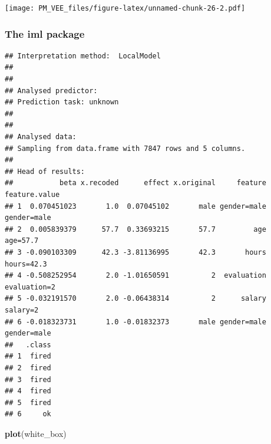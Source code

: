 \documentclass[]{krantz}
\newenvironment{Shaded}{\begin{snugshade}}{\end{snugshade}}
\newcommand{\DataTypeTok}[1]{\textcolor[rgb]{0.13,0.29,0.53}{#1}}
\newcommand{\DecValTok}[1]{\textcolor[rgb]{0.00,0.00,0.81}{#1}}
\newcommand{\KeywordTok}[1]{\textcolor[rgb]{0.13,0.29,0.53}{\textbf{#1}}}
\newcommand{\NormalTok}[1]{#1}
\newcommand{\OperatorTok}[1]{\textcolor[rgb]{0.81,0.36,0.00}{\textbf{#1}}}
\newcommand{\StringTok}[1]{\textcolor[rgb]{0.31,0.60,0.02}{#1}}
\theoremstyle{definition}
\theoremstyle{definition}
\theoremstyle{definition}
\theoremstyle{remark}
\begin{document}
\texttt{[image: PM\_VEE\_files/figure-latex/unnamed-chunk-26-2.pdf]}

\hypertarget{the-iml-package}{%
\subsubsection{\texorpdfstring{\textbf{The iml
package}}{The iml package}}\label{the-iml-package}}

\begin{Shaded}
\end{Shaded}

\begin{verbatim}
## Interpretation method:  LocalModel 
## 
## 
## Analysed predictor: 
## Prediction task: unknown 
## 
## 
## Analysed data:
## Sampling from data.frame with 7847 rows and 5 columns.
## 
## Head of results:
##           beta x.recoded      effect x.original     feature feature.value
## 1  0.070451023       1.0  0.07045102       male gender=male   gender=male
## 2  0.005839379      57.7  0.33693215       57.7         age      age=57.7
## 3 -0.090103309      42.3 -3.81136995       42.3       hours    hours=42.3
## 4 -0.508252954       2.0 -1.01650591          2  evaluation  evaluation=2
## 5 -0.032191570       2.0 -0.06438314          2      salary      salary=2
## 6 -0.018323731       1.0 -0.01832373       male gender=male   gender=male
##   .class
## 1  fired
## 2  fired
## 3  fired
## 4  fired
## 5  fired
## 6     ok
\end{verbatim}

\begin{Shaded}
\begin{Highlighting}[]
\KeywordTok{plot}\NormalTok{(white_box)}
\end{Highlighting}
\end{Shaded}
\end{document}
